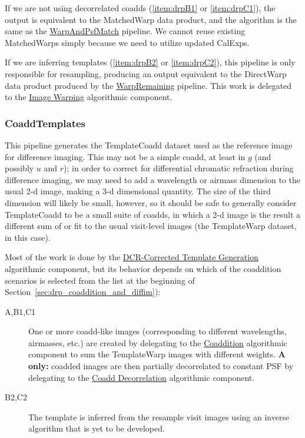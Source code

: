 If we are not using decorrelated coadds (\ref{item:drpB1} or \ref{item:drpC1}), the output is equivalent to the MatchedWarp data product, and the algorithm is the same as the \hyperref[sec:drpWarpAndPsfMatch]{WarpAndPsfMatch} pipeline.  We cannot reuse existing MatchedWarps simply because we need to utilize updated CalExps.

If we are inferring templates (\ref{item:drpB2} or \ref{item:drpC2}), this pipeline is only responsible for resampling, producing an output equivalent to the DirectWarp data product produced by the \hyperref[sec:drpWarpRemaining]{WarpRemaining} pipeline.  This work is delegated to the \hyperref[sec:acWarping]{Image Warping} algorithmic component.

\subsubsection{CoaddTemplates}
\label{sec:drpCoaddTemplates}

This pipeline generates the TemplateCoadd dataset used as the reference image for difference imaging.  This may not be a simple coadd, at least in $g$ (and possibly $u$ and $r$); in order to correct for differential chromatic refraction during difference imaging, we may need to add a wavelength or airmass dimension to the usual 2-d image, making a 3-d dimensional quantity.  The size of the third dimension will likely be small, however, so it should be safe to generally consider TemplateCoadd to be a small suite of coadds, in which a 2-d image is the result a different sum of or fit to the usual visit-level images (the TemplateWarp dataset, in this case).

Most of the work is done by the \hyperref[sec:acDCRTemplates]{DCR-Corrected Template Generation} algorithmic component, but its behavior depends on which of the coaddition scenarios is selected from the list at the beginning of Section~\ref{sec:drp_coaddition_and_diffim}):
\begin{description}
\item[A,B1,C1] One or more coadd-like images (corresponding to different wavelengths, airmasses, etc.) are created by delegating to the \hyperref[sec:acCoaddition]{Coaddition} algorithmic component to sum the TemplateWarp images with different weights.  \textbf{A only:} coadded images are then partially decorrelated to constant PSF by delegating to the \hyperref[sec:acCoaddDecorrelation]{Coadd Decorrelation} algorithmic component.
\item[B2,C2] The template is inferred from the resample visit images using an inverse algorithm that is yet to be developed.
\end{description}

